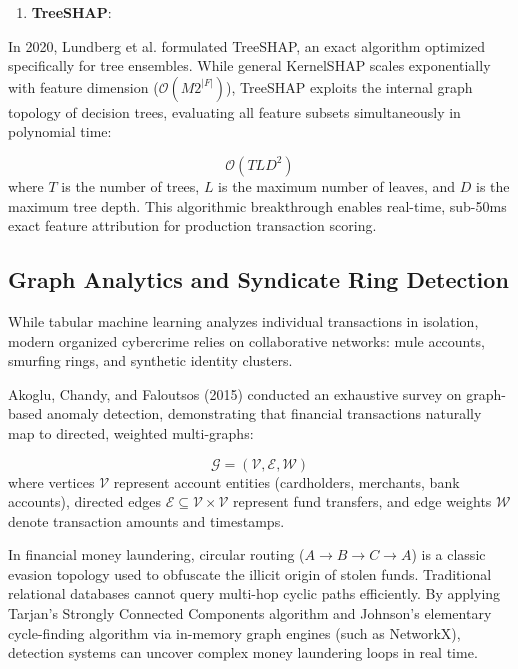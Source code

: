 \documentclass[12pt,a4paper,oneside]{report}
\begin{document}
\begin{enumerate}[leftmargin=0.35in]
\item \textbf{TreeSHAP}:
\end{enumerate}
In 2020, Lundberg et al. formulated TreeSHAP, an exact algorithm optimized specifically for tree ensembles. While general KernelSHAP scales exponentially with feature dimension ($\mathcal{O}(M 2^{|F|})$), TreeSHAP exploits the internal graph topology of decision trees, evaluating all feature subsets simultaneously in polynomial time:

\begin{equation}
\mathcal{O}(T L D^2)
\end{equation}
where $T$ is the number of trees, $L$ is the maximum number of leaves, and $D$ is the maximum tree depth. This algorithmic breakthrough enables real-time, sub-50ms exact feature attribution for production transaction scoring.


\subsection{Graph Analytics and Syndicate Ring Detection}

While tabular machine learning analyzes individual transactions in isolation, modern organized cybercrime relies on collaborative networks: mule accounts, smurfing rings, and synthetic identity clusters.


Akoglu, Chandy, and Faloutsos (2015) conducted an exhaustive survey on graph-based anomaly detection, demonstrating that financial transactions naturally map to directed, weighted multi-graphs:

\begin{equation}
\mathcal{G} = (\mathcal{V}, \mathcal{E}, \mathcal{W})
\end{equation}
where vertices $\mathcal{V}$ represent account entities (cardholders, merchants, bank accounts), directed edges $\mathcal{E} \subseteq \mathcal{V} \times \mathcal{V}$ represent fund transfers, and edge weights $\mathcal{W}$ denote transaction amounts and timestamps.


In financial money laundering, circular routing ($A \rightarrow B \rightarrow C \rightarrow A$) is a classic evasion topology used to obfuscate the illicit origin of stolen funds. Traditional relational databases cannot query multi-hop cyclic paths efficiently. By applying Tarjan's Strongly Connected Components algorithm and Johnson's elementary cycle-finding algorithm via in-memory graph engines (such as NetworkX), detection systems can uncover complex money laundering loops in real time.
\end{document}
